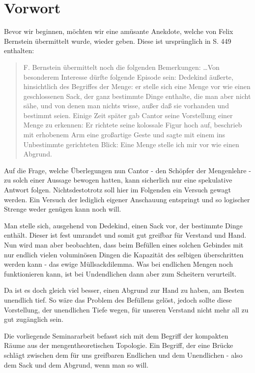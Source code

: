 \chapter{Vorwort}
Bevor wir beginnen, möchten wir eine amüsante Anekdote, welche von Felix Bernstein übermittelt 
wurde, wieder geben. Diese ist ursprünglich in \cite{book:dedekind} S. 449 enthalten:

\begin{quote}
\glqq F. Bernstein übermittelt noch die folgenden Bemerkungen:
\glq \dots Von besonderem Interesse dürfte folgende Episode sein: Dedekind äußerte, hinsichtlich 
des Begriffes der Menge: er stelle sich eine Menge vor wie einen geschlossenen
Sack, der ganz bestimmte Dinge enthalte, die man aber nicht sähe, und von denen man
nichts wisse, außer daß sie vorhanden und bestimmt seien. Einige Zeit später gab Cantor
seine Vorstellung einer Menge zu erkennen: Er richtete seine kolossale Figur hoch auf,
beschrieb mit erhobenem Arm eine großartige Geste und sagte mit einem ins Unbestimmte 
gerichteten Blick: \glq Eine Menge stelle ich mir vor wie einen Abgrund.\grq \grq \grqq
\end{quote}

Auf die Frage, welche Überlegungen nun Cantor - den Schöpfer der Mengenlehre - 
zu solch einer Aussage bewogen hatten, kann sicherlich nur eine spekulative Antwort folgen.
Nichtsdestotrotz soll hier im Folgenden ein Versuch gewagt werden. Ein Versuch der lediglich
eigener Anschauung entspringt und so logischer Strenge weder genügen kann noch will.

Man stelle sich, ausgehend von Dedekind, einen Sack vor, der bestimmte Dinge enthält.
Dieser ist fest umrandet und somit gut greifbar für Verstand und Hand. Nun wird man
aber beobachten, dass beim Befüllen eines solchen Gebindes mit nur endlich vielen voluminösen Dingen 
die Kapazität des selbigen überschritten werden kann - das ewige \glqq Müllsackdilemma\grqq .
Was bei endlichen Mengen noch funktionieren kann, ist bei Undendlichen dann aber zum Scheitern verurteilt.

Da ist es doch gleich viel besser, einen Abgrund zur Hand zu haben, am Besten unendlich tief. So wäre
das Problem des Befüllens gelöst, jedoch sollte diese Vorstellung, der unendlichen Tiefe wegen, für unseren
Verstand nicht mehr all zu gut zugänglich sein.

Die vorliegende Seminararbeit befasst sich mit dem Begriff der kompakten Räume aus der mengentheoretischen
Topologie. Ein Begriff, der eine Brücke schlägt zwischen dem für uns greifbaren Endlichen und dem
Unendlichen - also dem Sack und dem Abgrund, wenn man so will.

